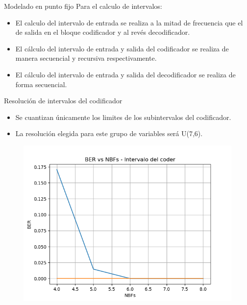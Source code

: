 \documentclass[xcolor=table]{beamer}
\begin{document}
\begin{frame}{Modelado en punto fijo}
Para el calculo de intervalos:
\begin{itemize}
    \item El calculo del intervalo de entrada se realiza a la mitad de frecuencia que el de salida en el bloque codificador y al revés decodificador.
    \item El cálculo del intervalo de entrada y salida del codificador se realiza de manera secuencial y recursiva respectivamente.
    \item El cálculo del intervalo de entrada y salida del decodificador se realiza de forma secuencial.
    \end{itemize}

\end{frame}


\begin{frame}{Resolución de intervalos del codificador}
\begin{itemize}
    \item Se cuantizan únicamente los limites de los subintervalos del codificador.
    \item La resolución elegida para este grupo de variables será U(7,6).
    \end{itemize}
    \begin{figure}
  \centering
  \includegraphics[width=0.60\paperwidth]{Graficos/cuantization.png}%
\end{figure}
\end{frame}
\end{document}
